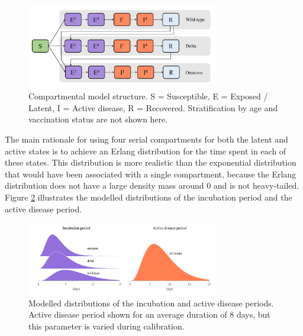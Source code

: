 \begin{figure}[ht]
    \begin{center}
    \includegraphics[width=0.75\textwidth]{../../tex_descriptions/models/sm_covid/sm_covid_se4i4r.pdf}
    \end{center}
    \caption{Compartmental model structure. 
    S = Susceptible, E = Exposed / Latent, I = Active disease, R = Recovered.
    Stratification by age and vaccination status are not shown here.
    } 
    \label{fig:se4i4r}
\end{figure}

The main rationale for using four serial compartments for both the latent and active states is to achieve an Erlang distribution for the time spent in each of these states. This distribution is more realistic than
the exponential distribution that would have been associated with a single compartment, because the Erlang distribution does not have a large density mass around 0 and is not heavy-tailed. Figure \ref{fig:sojourn} 
illustrates the modelled distributions of the incubation period and the active disease period. 

\begin{figure}[ht]
    \begin{center}
    \includegraphics[width=0.75\textwidth]{../../tex_descriptions/models/sm_covid/sojourns.pdf}
    \end{center}
    \caption{Modelled distributions of the incubation and active disease periods. Active disease period shown for an average duration of 8 days, but this parameter is varied during calibration.
    } 
    \label{fig:sojourn}
\end{figure}

